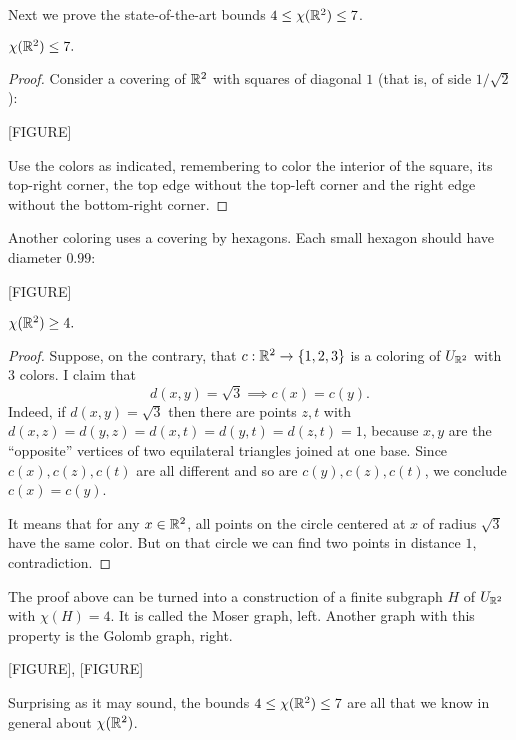 Next we prove the state-of-the-art bounds $4\leq\chi(\mathbb{R}^2)\leq 7$.

\begin{proposition}
$\chi(\mathbb{R}^2)\leq 7.$
\end{proposition}
\begin{proof}
Consider a covering of $\mathbb{R}^2$ with squares of diagonal $1$ (that is, of side $1/\sqrt{2}$):

[FIGURE]

Use the colors as indicated, remembering to color the interior of the square, its top-right corner, the top edge without the top-left corner and the right edge without the bottom-right corner.
\end{proof}

\begin{remark}
Another coloring uses a covering by hexagons. Each small hexagon should have diameter $0.99$:

[FIGURE]
\end{remark}


\begin{proposition}
$\chi(\mathbb{R}^2)\geq 4.$
\end{proposition}
\begin{proof}
Suppose, on the contrary, that $c:\mathbb{R}^2\to\{1,2,3\}$ is a coloring of $U_{\mathbb{R}^2}$ with $3$ colors. I claim that 
$$d(x,y)=\sqrt{3} \implies c(x)=c(y).$$
Indeed, if $d(x,y)=\sqrt{3}$ then there are points $z,t$ with $d(x,z)=d(y,z)=d(x,t)=d(y,t)=d(z,t)=1$, because $x,y$ are the ``opposite'' vertices of two equilateral triangles joined at one base. Since $c(x),c(z),c(t)$ are all different and so are $c(y),c(z),c(t)$, we conclude $c(x)=c(y)$.

It means that for any $x\in\mathbb{R}^2$, all points on the circle centered at $x$ of radius $\sqrt{3}$ have the same color. But on that circle we can find two points in distance $1$, contradiction.
\end{proof}

\begin{remark}
The proof above can be turned into a construction of a finite subgraph $H$ of $U_{\mathbb{R}^2}$ with $\chi(H)=4$. It is called the Moser graph, left. Another graph with this property is the Golomb graph, right.
\begin{center}
[FIGURE], [FIGURE]
\end{center}
\end{remark}
\begin{remark}
Surprising as it may sound, the bounds $4\leq\chi(\mathbb{R}^2)\leq 7$ are all that we know in general about $\chi(\mathbb{R}^2)$.
\end{remark}


